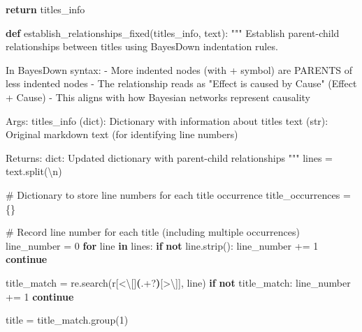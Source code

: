 \documentclass[
  11pt,
  letterpaper,
]{book}
\newenvironment{Shaded}{\begin{snugshade}}{\end{snugshade}}
\newcommand{\CharTok}[1]{\textcolor[rgb]{0.13,0.47,0.30}{#1}}
\newcommand{\CommentTok}[1]{\textcolor[rgb]{0.37,0.37,0.37}{#1}}
\newcommand{\ControlFlowTok}[1]{\textcolor[rgb]{0.00,0.23,0.31}{\textbf{#1}}}
\newcommand{\DecValTok}[1]{\textcolor[rgb]{0.68,0.00,0.00}{#1}}
\newcommand{\KeywordTok}[1]{\textcolor[rgb]{0.00,0.23,0.31}{\textbf{#1}}}
\newcommand{\NormalTok}[1]{\textcolor[rgb]{0.00,0.23,0.31}{#1}}
\newcommand{\OperatorTok}[1]{\textcolor[rgb]{0.37,0.37,0.37}{#1}}
\newcommand{\PreprocessorTok}[1]{\textcolor[rgb]{0.68,0.00,0.00}{#1}}
\newcommand{\StringTok}[1]{\textcolor[rgb]{0.13,0.47,0.30}{#1}}
\newcommand{\VerbatimStringTok}[1]{\textcolor[rgb]{0.13,0.47,0.30}{#1}}
\begin{document}
\begin{Shaded}
\begin{Highlighting}[]
    \ControlFlowTok{return}\NormalTok{ titles\_info}

\KeywordTok{def}\NormalTok{ establish\_relationships\_fixed(titles\_info, text):}
    \CommentTok{"""}
\CommentTok{    Establish parent{-}child relationships between titles using BayesDown indentation rules.}

\CommentTok{    In BayesDown syntax:}
\CommentTok{    {-} More indented nodes (with + symbol) are PARENTS of less indented nodes}
\CommentTok{    {-} The relationship reads as "Effect is caused by Cause" (Effect + Cause)}
\CommentTok{    {-} This aligns with how Bayesian networks represent causality}

\CommentTok{    Args:}
\CommentTok{        titles\_info (dict): Dictionary with information about titles}
\CommentTok{        text (str): Original markdown text (for identifying line numbers)}

\CommentTok{    Returns:}
\CommentTok{        dict: Updated dictionary with parent{-}child relationships}
\CommentTok{    """}
\NormalTok{    lines }\OperatorTok{=}\NormalTok{ text.split(}\StringTok{\textquotesingle{}}\CharTok{\textbackslash{}n}\StringTok{\textquotesingle{}}\NormalTok{)}

    \CommentTok{\# Dictionary to store line numbers for each title occurrence}
\NormalTok{    title\_occurrences }\OperatorTok{=}\NormalTok{ \{\}}

    \CommentTok{\# Record line number for each title (including multiple occurrences)}
\NormalTok{    line\_number }\OperatorTok{=} \DecValTok{0}
    \ControlFlowTok{for}\NormalTok{ line }\KeywordTok{in}\NormalTok{ lines:}
        \ControlFlowTok{if} \KeywordTok{not}\NormalTok{ line.strip():}
\NormalTok{            line\_number }\OperatorTok{+=} \DecValTok{1}
            \ControlFlowTok{continue}

\NormalTok{        title\_match }\OperatorTok{=}\NormalTok{ re.search(}\VerbatimStringTok{r\textquotesingle{}}\PreprocessorTok{[\textless{}}\CharTok{\textbackslash{}[}\PreprocessorTok{]}\KeywordTok{(}\DecValTok{.}\OperatorTok{+?}\KeywordTok{)}\PreprocessorTok{[\textgreater{}}\CharTok{\textbackslash{}]}\PreprocessorTok{]}\VerbatimStringTok{\textquotesingle{}}\NormalTok{, line)}
        \ControlFlowTok{if} \KeywordTok{not}\NormalTok{ title\_match:}
\NormalTok{            line\_number }\OperatorTok{+=} \DecValTok{1}
            \ControlFlowTok{continue}

\NormalTok{        title }\OperatorTok{=}\NormalTok{ title\_match.group(}\DecValTok{1}\NormalTok{)}


\end{Highlighting}
\end{Shaded}
\end{document}
